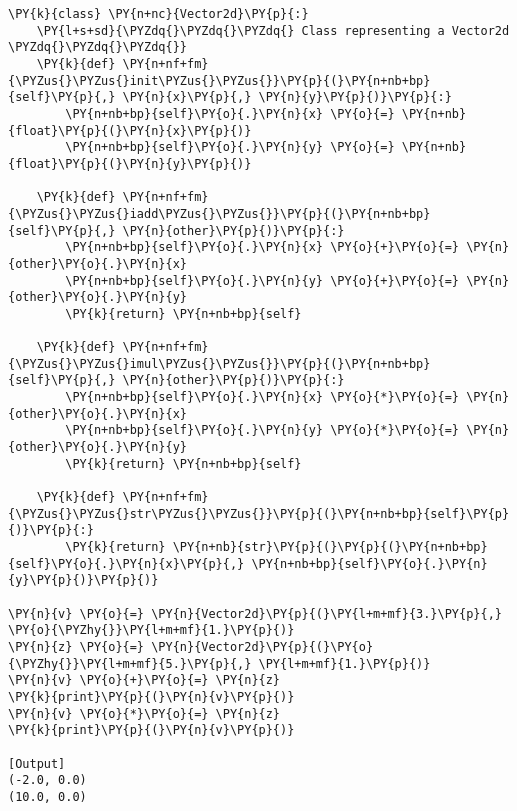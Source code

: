 \begin{Verbatim}[label=\makebox{\url{https://bitbucket.org/lbaldini/programming/src/tip/snippets/vector2d\_inplace.py}},commandchars=\\\{\}]
\PY{k}{class} \PY{n+nc}{Vector2d}\PY{p}{:}
    \PY{l+s+sd}{\PYZdq{}\PYZdq{}\PYZdq{} Class representing a Vector2d \PYZdq{}\PYZdq{}\PYZdq{}}   
    \PY{k}{def} \PY{n+nf+fm}{\PYZus{}\PYZus{}init\PYZus{}\PYZus{}}\PY{p}{(}\PY{n+nb+bp}{self}\PY{p}{,} \PY{n}{x}\PY{p}{,} \PY{n}{y}\PY{p}{)}\PY{p}{:}
        \PY{n+nb+bp}{self}\PY{o}{.}\PY{n}{x} \PY{o}{=} \PY{n+nb}{float}\PY{p}{(}\PY{n}{x}\PY{p}{)}
        \PY{n+nb+bp}{self}\PY{o}{.}\PY{n}{y} \PY{o}{=} \PY{n+nb}{float}\PY{p}{(}\PY{n}{y}\PY{p}{)}
    
    \PY{k}{def} \PY{n+nf+fm}{\PYZus{}\PYZus{}iadd\PYZus{}\PYZus{}}\PY{p}{(}\PY{n+nb+bp}{self}\PY{p}{,} \PY{n}{other}\PY{p}{)}\PY{p}{:}
        \PY{n+nb+bp}{self}\PY{o}{.}\PY{n}{x} \PY{o}{+}\PY{o}{=} \PY{n}{other}\PY{o}{.}\PY{n}{x}
        \PY{n+nb+bp}{self}\PY{o}{.}\PY{n}{y} \PY{o}{+}\PY{o}{=} \PY{n}{other}\PY{o}{.}\PY{n}{y}
        \PY{k}{return} \PY{n+nb+bp}{self}
        
    \PY{k}{def} \PY{n+nf+fm}{\PYZus{}\PYZus{}imul\PYZus{}\PYZus{}}\PY{p}{(}\PY{n+nb+bp}{self}\PY{p}{,} \PY{n}{other}\PY{p}{)}\PY{p}{:}
        \PY{n+nb+bp}{self}\PY{o}{.}\PY{n}{x} \PY{o}{*}\PY{o}{=} \PY{n}{other}\PY{o}{.}\PY{n}{x}
        \PY{n+nb+bp}{self}\PY{o}{.}\PY{n}{y} \PY{o}{*}\PY{o}{=} \PY{n}{other}\PY{o}{.}\PY{n}{y}
        \PY{k}{return} \PY{n+nb+bp}{self}
        
    \PY{k}{def} \PY{n+nf+fm}{\PYZus{}\PYZus{}str\PYZus{}\PYZus{}}\PY{p}{(}\PY{n+nb+bp}{self}\PY{p}{)}\PY{p}{:}
        \PY{k}{return} \PY{n+nb}{str}\PY{p}{(}\PY{p}{(}\PY{n+nb+bp}{self}\PY{o}{.}\PY{n}{x}\PY{p}{,} \PY{n+nb+bp}{self}\PY{o}{.}\PY{n}{y}\PY{p}{)}\PY{p}{)}
     
\PY{n}{v} \PY{o}{=} \PY{n}{Vector2d}\PY{p}{(}\PY{l+m+mf}{3.}\PY{p}{,} \PY{o}{\PYZhy{}}\PY{l+m+mf}{1.}\PY{p}{)}
\PY{n}{z} \PY{o}{=} \PY{n}{Vector2d}\PY{p}{(}\PY{o}{\PYZhy{}}\PY{l+m+mf}{5.}\PY{p}{,} \PY{l+m+mf}{1.}\PY{p}{)}
\PY{n}{v} \PY{o}{+}\PY{o}{=} \PY{n}{z}
\PY{k}{print}\PY{p}{(}\PY{n}{v}\PY{p}{)}
\PY{n}{v} \PY{o}{*}\PY{o}{=} \PY{n}{z}
\PY{k}{print}\PY{p}{(}\PY{n}{v}\PY{p}{)}

[Output]
(-2.0, 0.0)
(10.0, 0.0)
\end{Verbatim}